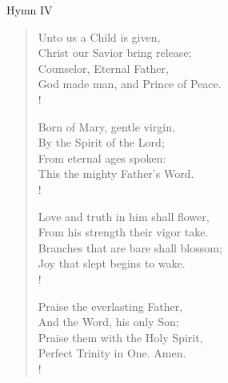 Hymn IV
\begin{verse}
Unto us a Child is given,\\
Christ our Savior bring release;\\
Counselor, Eternal Father,\\
God made man, and Prince of Peace.\\!

Born of Mary, gentle virgin,\\
By the Spirit of the Lord;\\
From eternal ages spoken:\\
This the mighty Father's Word.\\!

Love and truth in him shall flower,\\
From his strength their vigor take.\\
Branches that are bare shall blossom;\\
Joy that slept begins to wake.\\!

Praise the everlasting Father,\\
And the Word, his only Son;\\
Praise them with the Holy Spirit,\\
Perfect Trinity in One. Amen.\\!
\end{verse}
